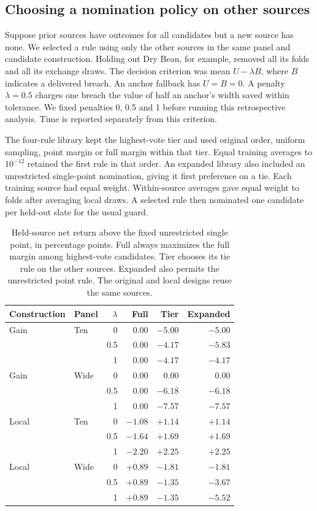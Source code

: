 \subsection{Choosing a nomination policy on other sources}
\label{sec:transfer-choice}
Suppose prior sources have outcomes for all candidates but a new source has none. We selected a rule using only the other sources in the same panel and candidate construction. Holding out Dry Bean, for example, removed all its folds and all its exchange draws. The decision criterion was mean $U-\lambda B$, where $B$ indicates a delivered breach. An anchor fallback has $U=B=0$. A penalty $\lambda=0.5$ charges one breach the value of half an anchor's width saved within tolerance. We fixed penalties 0, 0.5 and 1 before running this retrospective analysis. Time is reported separately from this criterion.

The four-rule library kept the highest-vote tier and used original order, uniform sampling, point margin or full margin within that tier. Equal training averages to $10^{-12}$ retained the first rule in that order. An expanded library also included an unrestricted single-point nomination, giving it first preference on a tie. Each training source had equal weight. Within-source averages gave equal weight to folds after averaging local draws. A selected rule then nominated one candidate per held-out slate for the usual guard.

\begin{table}[htb]
\centering\small
\caption{Held-source net return above the fixed unrestricted single point, in percentage points. Full always maximizes the full margin among highest-vote candidates. Tier chooses its tie rule on the other sources. Expanded also permits the unrestricted point rule. The original and local designs reuse the same sources.}
\label{tab:transfer-choice}
\begin{tabular}{@{}llrrrr@{}}
\toprule
Construction & Panel & $\lambda$ & Full & Tier & Expanded\\
\midrule
Gain & Ten & 0 & 0.00 & $-5.00$ & $-5.00$\\
     &     & 0.5 & 0.00 & $-4.17$ & $-5.83$\\
     &     & 1 & 0.00 & $-4.17$ & $-4.17$\\
Gain & Wide & 0 & 0.00 & 0.00 & 0.00\\
     &      & 0.5 & 0.00 & $-6.18$ & $-6.18$\\
     &      & 1 & 0.00 & $-7.57$ & $-7.57$\\
Local & Ten & 0 & $-1.08$ & $+1.14$ & $+1.14$\\
      &     & 0.5 & $-1.64$ & $+1.69$ & $+1.69$\\
      &     & 1 & $-2.20$ & $+2.25$ & $+2.25$\\
Local & Wide & 0 & $+0.89$ & $-1.81$ & $-1.81$\\
      &      & 0.5 & $+0.89$ & $-1.35$ & $-3.67$\\
      &      & 1 & $+0.89$ & $-1.35$ & $-5.52$\\
\bottomrule
\end{tabular}
\end{table}

